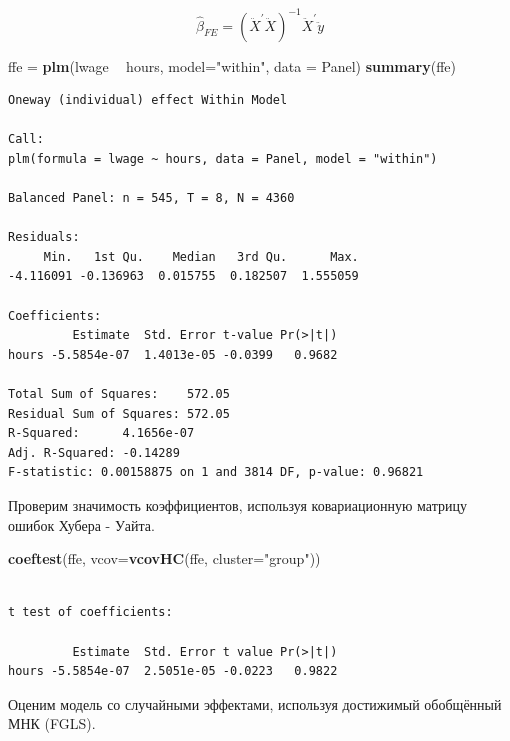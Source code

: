 \documentclass[]{book}
\newenvironment{Shaded}{\begin{snugshade}}{\end{snugshade}}
\newcommand{\DataTypeTok}[1]{\textcolor[rgb]{0.13,0.29,0.53}{#1}}
\newcommand{\KeywordTok}[1]{\textcolor[rgb]{0.13,0.29,0.53}{\textbf{#1}}}
\newcommand{\NormalTok}[1]{#1}
\newcommand{\OperatorTok}[1]{\textcolor[rgb]{0.81,0.36,0.00}{\textbf{#1}}}
\newcommand{\StringTok}[1]{\textcolor[rgb]{0.31,0.60,0.02}{#1}}
\begin{document}
\begin{equation}
\widehat{\beta}_{F E}=\left(\ddot{X}^{\prime} \ddot{X}\right)^{-1} \ddot{X}^{\prime} \ddot{y}
\end{equation}

\begin{Shaded}
\begin{Highlighting}[]
\NormalTok{ffe =}\StringTok{ }\KeywordTok{plm}\NormalTok{(lwage }\OperatorTok{~}\StringTok{ }\NormalTok{hours, }\DataTypeTok{model=}\StringTok{"within"}\NormalTok{, }\DataTypeTok{data =}\NormalTok{ Panel)}
\KeywordTok{summary}\NormalTok{(ffe)}
\end{Highlighting}
\end{Shaded}

\begin{verbatim}
Oneway (individual) effect Within Model

Call:
plm(formula = lwage ~ hours, data = Panel, model = "within")

Balanced Panel: n = 545, T = 8, N = 4360

Residuals:
     Min.   1st Qu.    Median   3rd Qu.      Max. 
-4.116091 -0.136963  0.015755  0.182507  1.555059 

Coefficients:
         Estimate  Std. Error t-value Pr(>|t|)
hours -5.5854e-07  1.4013e-05 -0.0399   0.9682

Total Sum of Squares:    572.05
Residual Sum of Squares: 572.05
R-Squared:      4.1656e-07
Adj. R-Squared: -0.14289
F-statistic: 0.00158875 on 1 and 3814 DF, p-value: 0.96821
\end{verbatim}

Проверим значимость коэффициентов, используя ковариационную матрицу ошибок Хубера - Уайта.

\begin{Shaded}
\begin{Highlighting}[]
\KeywordTok{coeftest}\NormalTok{(ffe, }\DataTypeTok{vcov=}\KeywordTok{vcovHC}\NormalTok{(ffe, }\DataTypeTok{cluster=}\StringTok{"group"}\NormalTok{))}
\end{Highlighting}
\end{Shaded}

\begin{verbatim}

t test of coefficients:

         Estimate  Std. Error t value Pr(>|t|)
hours -5.5854e-07  2.5051e-05 -0.0223   0.9822
\end{verbatim}

Оценим модель со случайными эффектами, используя достижимый обобщённый МНК (FGLS).
\end{document}
